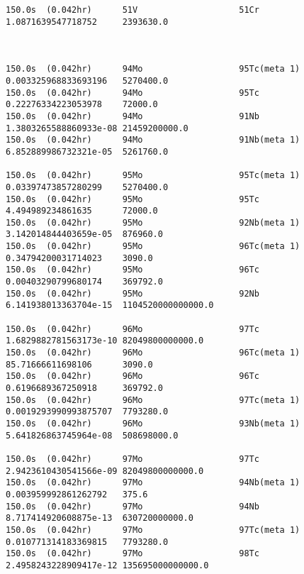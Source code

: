 \begin{lstlisting}[style=sOutputFile,caption={Final results for steel irradiation},label={listing:alexsteel}]
150.0s  (0.042hr)      51V                    51Cr                   1.0871639547718752     2393630.0             



150.0s  (0.042hr)      94Mo                   95Tc(meta 1)           0.003325968833693196   5270400.0             
150.0s  (0.042hr)      94Mo                   95Tc                   0.22276334223053978    72000.0               
150.0s  (0.042hr)      94Mo                   91Nb                   1.3803265588860933e-08 21459200000.0         
150.0s  (0.042hr)      94Mo                   91Nb(meta 1)           6.852889986732321e-05  5261760.0             

150.0s  (0.042hr)      95Mo                   95Tc(meta 1)           0.03397473857280299    5270400.0             
150.0s  (0.042hr)      95Mo                   95Tc                   4.494989234861635      72000.0               
150.0s  (0.042hr)      95Mo                   92Nb(meta 1)           3.142014844403659e-05  876960.0              
150.0s  (0.042hr)      95Mo                   96Tc(meta 1)           0.34794200031714023    3090.0                
150.0s  (0.042hr)      95Mo                   96Tc                   0.00403290799680174    369792.0              
150.0s  (0.042hr)      95Mo                   92Nb                   6.141938013363704e-15  1104520000000000.0    

150.0s  (0.042hr)      96Mo                   97Tc                   1.6829882781563173e-10 82049800000000.0      
150.0s  (0.042hr)      96Mo                   96Tc(meta 1)           85.71666611698106      3090.0                
150.0s  (0.042hr)      96Mo                   96Tc                   0.6196689367250918     369792.0              
150.0s  (0.042hr)      96Mo                   97Tc(meta 1)           0.0019293990993875707  7793280.0             
150.0s  (0.042hr)      96Mo                   93Nb(meta 1)           5.641826863745964e-08  508698000.0           

150.0s  (0.042hr)      97Mo                   97Tc                   2.9423610430541566e-09 82049800000000.0      
150.0s  (0.042hr)      97Mo                   94Nb(meta 1)           0.003959992861262792   375.6                 
150.0s  (0.042hr)      97Mo                   94Nb                   8.717414920608875e-13  630720000000.0        
150.0s  (0.042hr)      97Mo                   97Tc(meta 1)           0.010771314183369815   7793280.0             
150.0s  (0.042hr)      97Mo                   98Tc                   2.4958243228909417e-12 135695000000000.0     






\end{lstlisting}
